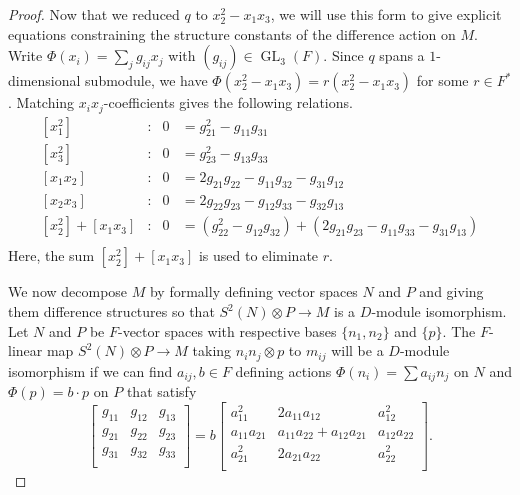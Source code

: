 \documentclass[11pt,reqno]{amsart}
\theoremstyle{definition}
\DeclareMathOperator{\GL}{GL}
\begin{document}
\begin{proof}
Now that we reduced $q$ to $x_2^2 - x_1 x_3$, we will use this form to give explicit equations constraining the structure constants of the difference action on $M$. Write $\Phi (x_{i}) = \sum_j g_{ij}x_{j}$ with $(g_{ij}) \in \GL_3(F)$. 
Since $q$ spans a $1$-dimensional submodule, we have $\Phi(x_2^2 - x_1 x_3) = r ( x_2^2 - x_1 x_3)$ for some $r \in F^*$.
Matching $x_i x_j$-coefficients gives the following relations.
\begin{equation}
\begin{aligned} 
\label{eq:g-relations}
[x_{1}^{2}]&:& 0&= g_{21}^{2}-g_{11}g_{31}\\
[x_{3}^{2}]&:& 0&= g_{23}^{2}-g_{13}g_{33}\\
[x_{1}x_{2}]&:& 0&= 2g_{21}g_{22}-g_{11}g_{32}-g_{31}g_{12}\\
[x_{2}x_{3}]&:& 0&= 2g_{22}g_{23}-g_{12}g_{33}-g_{32}g_{13}\\
[x_{2}^{2}] + [x_{1}x_{3}]&:& 0&= (g_{22}^{2}-g_{12}g_{32}) + (2g_{21}g_{23}-g_{11}g_{33}-g_{31}g_{13})\\
\end{aligned}
\end{equation}
Here, the sum $[x_{2}^{2}] + [x_{1}x_{3}]$ is used to eliminate $r$.

We now decompose $M$ by formally defining vector spaces $N$ and $P$ and giving them difference structures so that $S^{2}(N)\otimes P\to M$ is a $D$-module isomorphism. Let $N$ and $P$ be $F$-vector spaces with respective bases $\{n_{1},n_{2}\}$ and $\{p\}$. The $F$-linear map $S^{2}(N)\otimes P\to M$ taking $n_{i}n_{j}\otimes p$ to $m_{ij}$ will be a $D$-module isomorphism if we can find $a_{ij},b\in F$ defining actions $\Phi (n_{i}) = \sum a_{ij}n_{j}$ on $N$ and $\Phi (p) = b\cdot p$ on $P$ that satisfy
\begin{equation}
\label{eq:g-a-relations}
    \begin{bmatrix}
        g_{11}& g_{12} & g_{13}\\
        g_{21}& g_{22} & g_{23}\\
        g_{31}& g_{32} & g_{33}\\
    \end{bmatrix}
    =b
    \begin{bmatrix}
        a_{11}^{2}& 2a_{11}a_{12} & a_{12}^{2}\\
        a_{11}a_{21}& a_{11}a_{22}+a_{12}a_{21} & a_{12}a_{22}\\
        a_{21}^{2}& 2a_{21}a_{22} & a_{22}^{2}\\
    \end{bmatrix}.
\end{equation}


\end{proof}
\end{document}
